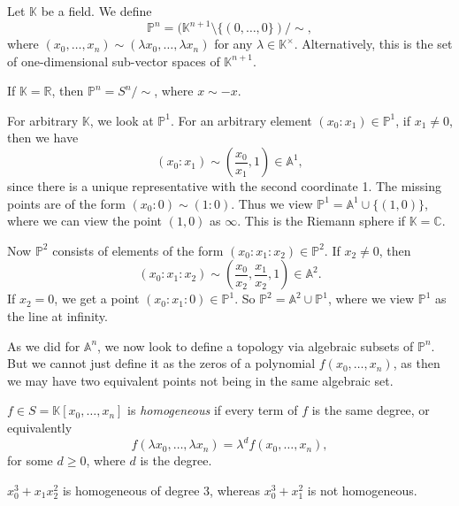 \documentclass[12pt]{article}
\begin{document}
\begin{definition}
	Let $\mathbb{K}$ be a field. We define
	\[
		\mathbb{P}^n = (\mathbb{K}^{n+1} \setminus \{(0, \ldots, 0\}) / \sim,
	\]
	where $(x_0, \ldots, x_n) \sim (\lambda x_0, \ldots, \lambda x_n)$ for any  $\lambda \in \mathbb{K}^\times$. Alternatively, this is the set of one-dimensional sub-vector spaces of $\mathbb{K}^{n+1}$.
\end{definition}

\begin{remark}
	If $\mathbb{K} = \mathbb{R}$, then $\mathbb{P}^n = S^n / \sim$, where $x \sim -x$.
\end{remark}

For arbitrary $\mathbb{K}$, we look at $\mathbb{P}^1$. For an arbitrary element $(x_0: x_1) \in \mathbb{P}^1$, if $x_1 \neq 0$, then we have
\[
	(x_0 : x_1) \sim \left( \frac{x_0}{x_1}, 1\right) \in \mathbb{A}^1,
\]
since there is a unique representative with the second coordinate 1. The missing points are of the form $(x_0 : 0) \sim (1 : 0)$. Thus we view $\mathbb{P}^1 = \mathbb{A}^1 \cup\{(1, 0)\}$, where we can view the point $(1, 0)$ as $\infty$. This is the Riemann sphere if $\mathbb{K} = \mathbb{C}$.

Now $\mathbb{P}^2$ consists of elements of the form $(x_0 : x_1 : x_2) \in \mathbb{P}^2$. If $x_2 \neq 0$, then
\[
	(x_0 : x_1 : x_2) \sim \left( \frac{x_0}{x_2}, \frac{x_1}{x_2}, 1 \right) \in \mathbb{A}^2.
\]
If $x_2 = 0$, we get a point $(x_0 : x_1: 0) \in \mathbb{P}^1$. So $\mathbb{P}^2 = \mathbb{A}^2 \cup \mathbb{P}^1$, where we view $\mathbb{P}^1$ as the line at infinity.

As we did for $\mathbb{A}^n$, we now look to define a topology via algebraic subsets of $\mathbb{P}^n$. But we cannot just define it as the zeros of a polynomial $f(x_0, \ldots, x_n)$, as then we may have two equivalent points not being in the same algebraic set.

\begin{definition}
	$f \in S = \mathbb{K}[x_0, \ldots, x_n]$ is \emph{homogeneous} if every term of $f$ is the same degree, or equivalently 
	\[
	f(\lambda x_0, \ldots, \lambda x_n) = \lambda^d f(x_0, \ldots, x_n),
	\]
	for some $d \geq 0$, where $d$ is the degree.
\end{definition}

\begin{exbox}
	$x_0^3 + x_1x_2^2$ is homogeneous of degree 3, whereas $x_0^3 + x_1^2$ is not homogeneous.
\end{exbox}
\end{document}
